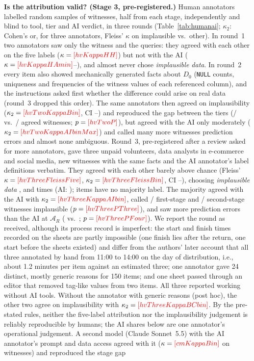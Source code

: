 \textbf{Is the attribution valid? (Stage 3, pre-registered.)} Human annotators labelled random samples of witnesses, half from each stage, independently and blind to tool, tier and AI verdict, in three rounds (Table~\ref{tab:humanai}; $\kappa_2$: Cohen's or, for three annotators, Fleiss' $\kappa$ on implausible vs.\ other). In round~1 two annotators saw only the witness and the queries: they agreed with each other on the five labels ($\kappa=\V{hvKappaHH}$) but not with the AI ($\kappa=\V{hvKappaHAmin}$--), and almost never chose \emph{implausible data}. In round~2 every item also showed mechanically generated facts about $D_0$ (\texttt{NULL} counts, uniqueness and frequencies of the witness values of each referenced column), and the instructions asked first whether the difference could arise on real data (round~3 dropped this order). The same annotators then agreed on implausibility ($\kappa_2=\V{hvTwoKappaBin}$, CI --) and reproduced the gap between the tiers (/ vs.\ / agreed witnesses; $p=\V{hvTwoP}$), but agreed with the AI only moderately ($\kappa_2=\V{hvTwoKappaAIbinMax}$) and called many more witnesses prediction errors and almost none ambiguous. Round~3, pre-registered after a review asked for more annotators, gave three unpaid volunteers, data analysts in e-commerce and social media,  new witnesses with the same facts and the AI annotator's label definitions verbatim. They agreed with each other barely above chance (Fleiss' $\kappa=\V{hvThreeFleissFive}$, $\kappa_2=\V{hvThreeFleissBin}$, CI --), choosing \emph{implausible data} ,  and  times (AI: );  items have no majority label. The majority agreed with the AI with $\kappa_2=\V{hvThreeKappaAIbin}$, called / first-stage and / second-stage witnesses implausible ($p=\V{hvThreePThree}$), and saw more prediction errors than the AI at $\mathcal A_R$ ( vs.\ ; $p=\V{hvThreePFour}$). We report the round as received, although its process record is imperfect: the start and finish times recorded on the sheets are partly impossible (one finish lies after the return, one start before the sheets existed) and differ from the authors' later account that all three annotated by hand from 11:00 to 14:00 on the day of distribution, i.e., about 1.2 minutes per item against an estimated three; one annotator gave 24 distinct, mostly generic reasons for 150 items; and one sheet passed through an editor that removed tag-like values from two items. All three reported working without AI tools. Without the annotator with generic reasons (post hoc), the other two agree on implausibility with $\kappa_2=\V{hvThreeKappaBCbin}$. By the pre-stated rules, neither the five-label attribution nor the implausibility judgement is reliably reproducible by humans; the AI shares below are one annotator's operational judgement. A second model (Claude Sonnet~5.5) with the AI annotator's prompt and data access agreed with it ($\kappa=\V{cmKappaBin}$ on  witnesses) and reproduced the stage gap 